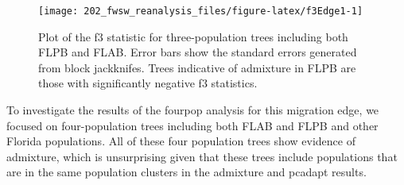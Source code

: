 \documentclass[11pt,]{article}
\newenvironment{Shaded}{\begin{snugshade}}{\end{snugshade}}
\newcommand{\KeywordTok}[1]{\textcolor[rgb]{0.13,0.29,0.53}{\textbf{#1}}}
\newcommand{\DataTypeTok}[1]{\textcolor[rgb]{0.13,0.29,0.53}{#1}}
\newcommand{\StringTok}[1]{\textcolor[rgb]{0.31,0.60,0.02}{#1}}
\newcommand{\OtherTok}[1]{\textcolor[rgb]{0.56,0.35,0.01}{#1}}
\newcommand{\OperatorTok}[1]{\textcolor[rgb]{0.81,0.36,0.00}{\textbf{#1}}}
\newcommand{\NormalTok}[1]{#1}
\begin{document}
\begin{figure}[H]
\texttt{[image: 202\_fwsw\_reanalysis\_files/figure-latex/f3Edge1-1]} \caption{Plot of the f3 statistic for three-population trees including both FLPB and FLAB. Error bars show the standard errors generated from block jackknifes. Trees indicative of admixture in FLPB are those with significantly negative f3 statistics.}\label{fig:f3Edge1}
\end{figure}

To investigate the results of the fourpop analysis for this migration
edge, we focused on four-population trees including both FLAB and FLPB
and other Florida populations. All of these four population trees show
evidence of admixture, which is unsurprising given that these trees
include populations that are in the same population clusters in the
admixture and pcadapt results.

\begin{Shaded}
\end{Shaded}
\end{document}
